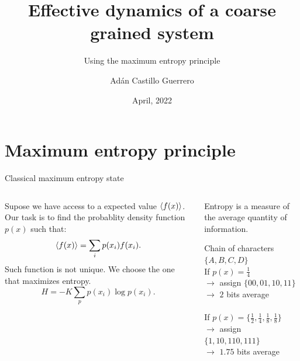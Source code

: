 \documentclass{cubeamer}
\title{Effective dynamics of a coarse grained system}
\subtitle{Using the maximum entropy principle}
\author[Adán Castillo Guerrero]{Adán Castillo Guerrero}
\date{April, 2022} %
\institute[National Autonomous University of Mexico]{National Autonomous University of Mexico}
\begin{document}
\maketitle

\cutoc
\section{Maximum entropy principle}

\begin{frame}{Classical maximum entropy state}
    \begin{columns}
        \begin{column}{0.5\textwidth}
            Supose we have access to a expected value $\expval{f(x)}$. Our task is to find the probablity density function $p(x)$ such that:
            \begin{equation*}
                \expval{f(x)}=\sum_{i}p(x_{i})f(x_{i}).
            \end{equation*}
            Such function is not unique. We choose the one that maximizes entropy.
                \begin{equation*}
                    H=-K\sum_{p}p(x_{i})\log{p(x_{i})}.
                \end{equation*}
        \end{column}
        \begin{column}{0.5\textwidth}
                Entropy is a measure of the average quantity of information. \\
                \vspace{0.2cm}
                \begin{tcolorbox}
                    Chain of characters $\{A,B,C,D\}$\\
                    If $p(x)=\frac{1}{4}$\\
                    $\rightarrow$ assign $\{00, 01, 10, 11\}$\\
                    $\rightarrow$ $2$ bits average\\
                    \\
                    If $p(x)=\{\frac{1}{2},\frac{1}{4},\frac{1}{8},\frac{1}{8}\}$\\
                    $\rightarrow$ assign $\{1, 10, 110, 111\}$\\
                    $\rightarrow$ $1.75$  bits average
                \end{tcolorbox}
        \end{column}
    \end{columns}
\end{frame}
\end{document}
